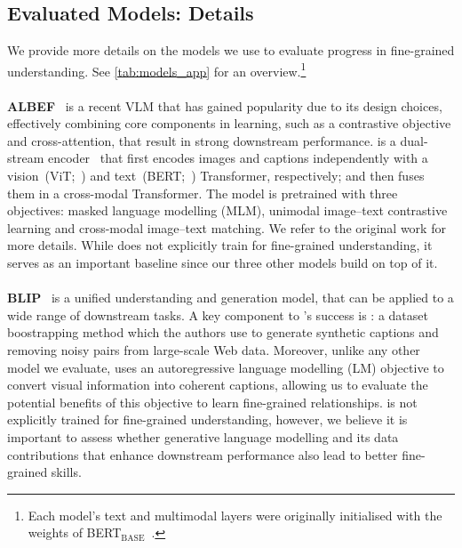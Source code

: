 \subsection{Evaluated Models: Details} \label{app:models}
We provide more details on the models we use to evaluate progress in fine-grained \vl understanding.
See \cref{tab:models_app} for an overview.\footnote{Each model's text and multimodal layers were originally initialised with the weights of BERT$_\text{BASE}$~\cite{bert}.}

\paragraph{}
\noindent\textbf{ALBEF}~\cite{albef} is a recent VLM that has gained popularity due to its design choices, effectively combining core components in \vl learning, such as a contrastive objective and cross-attention, that result in strong downstream performance.
\albef is a dual-stream encoder~\cite{unmasked} that first encodes images and captions independently with a vision~(ViT;~\citealt{vit,deit}) and text~(BERT;~\citealt{bert}) Transformer, respectively; and then fuses them in a cross-modal Transformer.
The model is pretrained with three objectives: masked language modelling (MLM), unimodal image--text contrastive learning and cross-modal image--text matching.
We refer to the original work for more details.
While \albef does not explicitly train for fine-grained understanding, it serves as an important baseline since our three other models build on top of it.

\paragraph{}
\noindent \textbf{BLIP}~\cite{blip} is a unified \vl understanding and generation model, that can be applied to a wide range of downstream tasks.
A key component to \blip's success is \capfilt: a dataset boostrapping method which the authors use to generate synthetic captions and removing noisy pairs from large-scale Web data.
Moreover, unlike any other model we evaluate, \blip uses an autoregressive language modelling (LM) objective to convert visual information into coherent captions, allowing us to evaluate the potential benefits of this objective to learn fine-grained relationships.
\blip is not explicitly trained for fine-grained understanding, however, we believe it is important to assess whether generative language modelling and its data contributions that enhance downstream performance also lead to better fine-grained skills.

